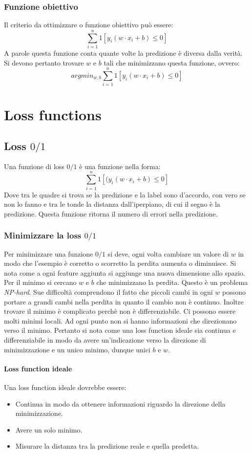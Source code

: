 		\subsubsection{Funzione obiettivo}
		Il criterio da ottimizzare o funzione obiettivo pu\`o essere:
		$$\sum\limits_{i=1}^n1[y_i(w\cdot x_i+b)\le 0]$$
		A parole questa funzione conta quante volte la predizione \`e diversa dalla verit\`a. 
		Si devono pertanto trovare $w$ e $b$ tali che minimizzano questa funzione, ovvero:
		$$argmin_{w,b}\sum\limits_{i=1}^n1[y_i(w\cdot x_i+b)\le 0]$$

\section{Loss functions}

	\subsection{Loss $0/1$}
	Una funzione di loss $0/1$ \`e una funzione nella forma:
	$$\sum\limits_{i=1}^n1[(y_i(w\cdot x_i+b)\le 0]$$
	Dove tra le quadre si trova se la predizione e la label sono d'accordo, con vero se non lo fanno e tra le tonde la distanza dall'iperpiano, di cui il segno \`e la predizione.
	Questa funzione ritorna il numero di errori nella predizione.

		\subsubsection{Minimizzare la loss $0/1$}
		Per minimizzare una funzione $0/1$ si deve, ogni volta cambiare un valore di $w$ in modo che l'esempio \`e corretto o scorretto la perdita aumenta o diminuisce.
		Si nota come a ogni feature aggiunta si aggiunge una nuova dimensione allo spazio.
		Per il minimo si cercano $w$ e $b$ che minimizzano la perdita.
		Questo \`e un problema \emph{NP-hard}.
		Sue difficolt\`a comprendono il fatto che piccoli cambi in ogni $w$ possono portare a grandi cambi nella perdita in quanto il cambio non \`e continuo. 
		Inoltre trovare il minimo \`e complicato perch\`e non \`e differenziabile.
		Ci possono essere molti minimi locali.
		Ad ogni punto non si hanno informazioni che direzionano verso il minimo.
		Pertanto si nota come una loss function ideale sia continua e differenziabile in modo da avere un'indicazione verso la direzione di minimizzazione e un unico minimo, dunque unici $b$ e $w$.
		
		\paragraph{Loss function ideale}
		Una loss function ideale dovrebbe essere:
		\begin{itemize}
			\item Continua in modo da ottenere informazioni riguardo la direzione della minimizzazione.
			\item Avere un solo minimo.
			\item Misurare la distanza tra la predizione reale e quella predetta.
		\end{itemize}

